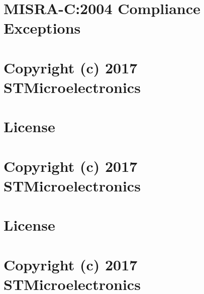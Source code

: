 \documentclass[twoside]{book}
\newcommand{\+}{\discretionary{\mbox{\scriptsize$\hookleftarrow$}}{}{}}
\begin{document}
\chapter{MISRA-\/C\+:2004 Compliance Exceptions}
\label{_c_m_s_i_s__m_i_s_r_a__exceptions}

\chapter{Copyright (c) 2017 STMicroelectronics}
\label{md_nucleo_l432c_piezo_beeper__switch_buzz__drivers__s_t_m32_l4xx__h_a_l__driver__license}

\chapter{License}
\label{md_nucleo_l432kc_4x4rgb__drivers__c_m_s_i_s__device__s_t__s_t_m32_l4xx__license}

\chapter{Copyright (c) 2017 STMicroelectronics}
\label{md_nucleo_l432kc_4x4rgb__drivers__s_t_m32_l4xx__h_a_l__driver__license}

\chapter{License}
\label{md_nucleo_l432kc_9dof_imu_click__drivers__c_m_s_i_s__device__s_t__s_t_m32_l4xx__license}

\chapter{Copyright (c) 2017 STMicroelectronics}
\label{md_nucleo_l432kc_9dof_imu_click__drivers__s_t_m32_l4xx__h_a_l__driver__license}

\end{document}
